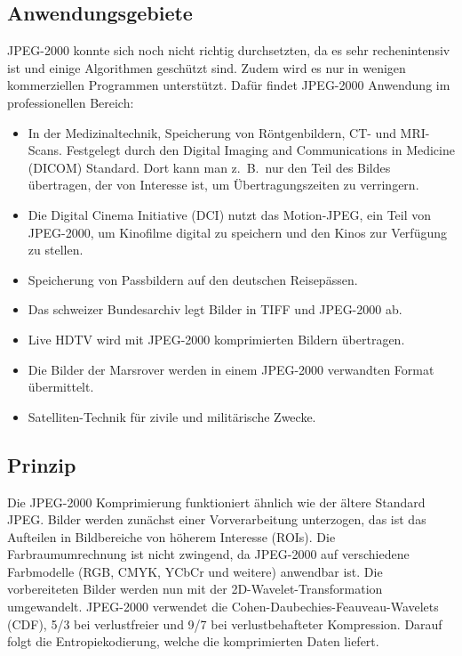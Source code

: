 \subsection{Anwendungsgebiete
\label{jpeg:subsection:anwendungsgebiete}}
JPEG-2000 konnte sich noch nicht richtig durchsetzten, da es sehr rechenintensiv ist und einige Algorithmen geschützt sind.
Zudem wird es nur in wenigen kommerziellen Programmen unterstützt.
Dafür findet JPEG-2000 Anwendung im professionellen Bereich:
\begin{itemize}
    \item In der Medizinaltechnik, Speicherung von Röntgenbildern, CT- und MRI-Scans.
    Festgelegt durch den Digital Imaging and Communications in Medicine (DICOM) Standard.
%
%
    Dort kann man z.~B.~nur den Teil des Bildes übertragen, der von Interesse ist, um Übertragungszeiten zu verringern.
    \item Die Digital Cinema Initiative (DCI) nutzt das Motion-JPEG, ein Teil von JPEG-2000, um Kinofilme digital zu speichern und den Kinos zur Verfügung zu stellen.
%
%
    \item Speicherung von Passbildern auf den deutschen Reisepässen.
    \item Das schweizer Bundesarchiv legt Bilder in TIFF und JPEG-2000 ab.
%
    \item Live HDTV wird mit JPEG-2000 komprimierten Bildern übertragen.
%
    \item Die Bilder der Marsrover werden in einem JPEG-2000 verwandten Format übermittelt.
%
    \item Satelliten-Technik für zivile und militärische Zwecke.   
\end{itemize}


\subsection{Prinzip
\label{jpeg:subsection:prinzip}}
Die JPEG-2000 Komprimierung funktioniert ähnlich wie der ältere Standard JPEG.
Bilder werden zunächst einer Vorverarbeitung unterzogen, das ist das Aufteilen in Bildbereiche von höherem Interesse (ROIs).
Die Farbraumumrechnung ist nicht zwingend, da JPEG-2000 auf verschiedene Farbmodelle (RGB, CMYK, YCbCr und weitere) anwendbar ist.
%
%
%
Die vorbereiteten Bilder werden nun mit der 2D-Wavelet-Transformation umgewandelt.
JPEG-2000 verwendet die Cohen-Daubechies-Feauveau-Wavelets (CDF), 5/3 bei verlustfreier und 9/7 bei verlustbehafteter Kompression.
%
%
Darauf folgt die Entropiekodierung, welche die komprimierten Daten liefert. 

